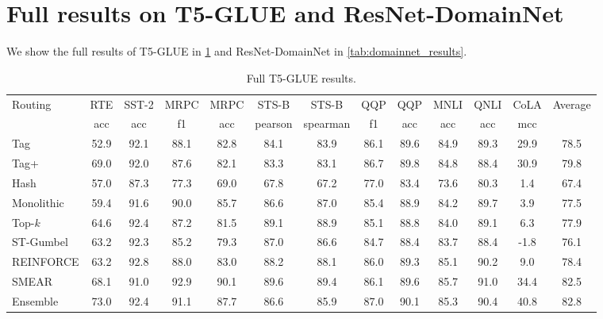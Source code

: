 \documentclass{article}
\theoremstyle{plain}
\theoremstyle{definition}
\theoremstyle{remark}
\begin{document}
\section{Full results on T5-GLUE and ResNet-DomainNet}
\label{sec:full_results}
We show the full results of T5-GLUE in \cref{tab:glue_results} and ResNet-DomainNet in \cref{tab:domainnet_results}.
\begin{table}
    \centering
\begin{adjustbox}{angle=90}
    \begin{tabular}{l c c c c c c c c c c c c}
      \toprule
      Routing & RTE  & SST-2 & MRPC  & MRPC  & STS-B  & STS-B  & QQP  & QQP  & MNLI  & QNLI  & CoLA & Average \\
       & acc & acc & f1 & acc & pearson &  spearman & f1 & acc & acc & acc & mcc & \\
      \midrule
      Tag & 52.9 & 92.1 & 88.1 & 82.8 & 84.1 & 83.9 & 86.1 & 89.6 & 84.9 & 89.3 & 29.9 & 78.5 \\
      Tag+ & 69.0 & 92.0 & 87.6 & 82.1 & 83.3 & 83.1 & 86.7 & 89.8 & 84.8 & 88.4 & 30.9 & 79.8 \\
      Hash & 57.0 & 87.3 & 77.3 & 69.0 & 67.8 & 67.2 & 77.0 & 83.4 & 73.6 & 80.3 & 1.4 & 67.4 \\
      Monolithic & 59.4 & 91.6 & 90.0 & 85.7 & 86.6 & 87.0 & 85.4 & 88.9 & 84.2 & 89.7 & 3.9 & 77.5 \\
      Top-$k$ & 64.6 & 92.4 & 87.2 & 81.5 & 89.1 & 88.9 & 85.1 & 88.8 & 84.0 & 89.1 & 6.3 & 77.9 \\
      ST-Gumbel & 63.2 & 92.3 & 85.2 & 79.3 & 87.0 & 86.6 & 84.7 & 88.4 & 83.7 & 88.4 & -1.8 & 76.1 \\
      REINFORCE & 63.2 & 92.8 & 88.0 & 83.0 & 88.2 & 88.1 & 86.0 & 89.3 & 85.1 & 90.2 & 9.0 & 78.4 \\
      SMEAR & 68.1 & 91.0 & 92.9 & 90.1 & 89.6 & 89.4 & 86.1 & 89.6 & 85.7 & 91.0 & 34.4 & 82.5 \\ 
      Ensemble & 73.0 & 92.4 & 91.1 & 87.7 & 86.6 & 85.9 & 87.0 & 90.1 & 85.3 & 90.4 & 40.8 & 82.8 \\
      \bottomrule
    \end{tabular}
\end{adjustbox}
    \caption{Full T5-GLUE results.}
    \label{tab:glue_results}
\end{table}
\end{document}
